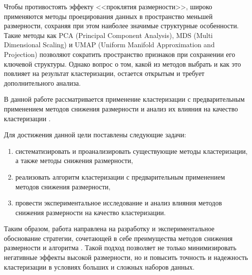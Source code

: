     Чтобы противостоять эффекту <<проклятия размерности>>, широко применяются методы проецирования данных в пространство меньшей размерности, сохраняя при этом наиболее значимые структурные особенности. Такие методы как PCA (Principal Component Analysis), MDS (Multi Dimensional Scaling) и UMAP (Uniform Manifold Approximation and Projection) позволяют сократить пространство признаков при сохранении его ключевой структуры. Однако вопрос о том, какой из методов выбрать и как это повлияет на результат кластеризации, остается открытым и требует дополнительного анализа.

    В данной работе рассматривается применение кластеризации с предварительным применением методов снижения размерности и анализ их влияния на качество кластеризации \kmeans{}.

    Для достижения данной цели поставлены следующие задачи:
    \begin{enumerate}
        \item систематизировать и проанализировать существующие методы кластеризации, а также методы снижения размерности,
        \item реализовать алгоритм кластеризации  с предварительным применением методов снижения размерности,
        \item провести экспериментальное исследование и анализ влияния методов снижения размерности на качество кластеризации.
    \end{enumerate}

    Таким образом, работа направлена на разработку и экспериментальное обоснование стратегии, сочетающей в себе преимущества методов снижения размерности и алгоритма \kmeans{}. Такой подход позволяет не только минимизировать негативные эффекты высокой размерности, но и повысить точность и надежность кластеризации в условиях больших и сложных наборов данных.
